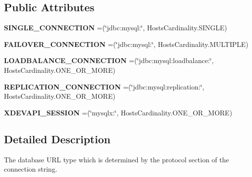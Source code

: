\subsection*{Public Attributes}
\begin{DoxyCompactItemize}
\item 
\mbox{\label{enumcom_1_1mysql_1_1cj_1_1conf_1_1_connection_url_1_1_type_a48648ec33433ce9dfa4a67f27acaa0b3}} 
{\bfseries S\+I\+N\+G\+L\+E\+\_\+\+C\+O\+N\+N\+E\+C\+T\+I\+ON} =(\char`\"{}jdbc\+:mysql\+:\char`\"{}, Hosts\+Cardinality.\+S\+I\+N\+G\+LE)
\item 
\mbox{\label{enumcom_1_1mysql_1_1cj_1_1conf_1_1_connection_url_1_1_type_aa2a215d8ff6199735c6e2543a16dd3ee}} 
{\bfseries F\+A\+I\+L\+O\+V\+E\+R\+\_\+\+C\+O\+N\+N\+E\+C\+T\+I\+ON} =(\char`\"{}jdbc\+:mysql\+:\char`\"{}, Hosts\+Cardinality.\+M\+U\+L\+T\+I\+P\+LE)
\item 
\mbox{\label{enumcom_1_1mysql_1_1cj_1_1conf_1_1_connection_url_1_1_type_a3eee8edf85b7e8dc203d2edc97006252}} 
{\bfseries L\+O\+A\+D\+B\+A\+L\+A\+N\+C\+E\+\_\+\+C\+O\+N\+N\+E\+C\+T\+I\+ON} =(\char`\"{}jdbc\+:mysql\+:loadbalance\+:\char`\"{}, Hosts\+Cardinality.\+O\+N\+E\+\_\+\+O\+R\+\_\+\+M\+O\+RE)
\item 
\mbox{\label{enumcom_1_1mysql_1_1cj_1_1conf_1_1_connection_url_1_1_type_a4c2301896aad3ca53cbc7d88d34630b9}} 
{\bfseries R\+E\+P\+L\+I\+C\+A\+T\+I\+O\+N\+\_\+\+C\+O\+N\+N\+E\+C\+T\+I\+ON} =(\char`\"{}jdbc\+:mysql\+:replication\+:\char`\"{}, Hosts\+Cardinality.\+O\+N\+E\+\_\+\+O\+R\+\_\+\+M\+O\+RE)
\item 
\mbox{\label{enumcom_1_1mysql_1_1cj_1_1conf_1_1_connection_url_1_1_type_ac40e1e74b0d797302f6c1caf03b015e1}} 
{\bfseries X\+D\+E\+V\+A\+P\+I\+\_\+\+S\+E\+S\+S\+I\+ON} =(\char`\"{}mysqlx\+:\char`\"{}, Hosts\+Cardinality.\+O\+N\+E\+\_\+\+O\+R\+\_\+\+M\+O\+RE)
\end{DoxyCompactItemize}


\subsection{Detailed Description}
The database U\+RL type which is determined by the protocol section of the connection string. 

